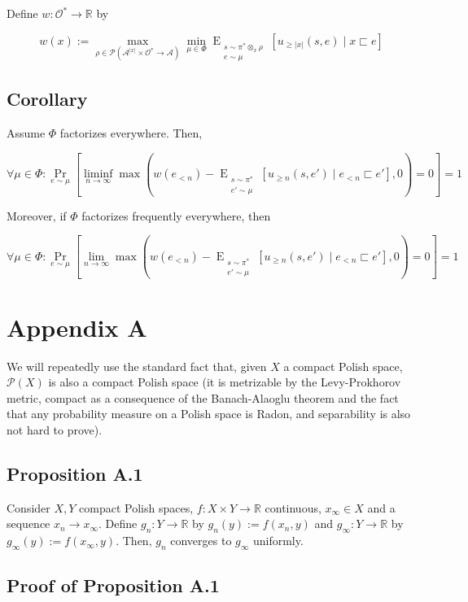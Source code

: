 \documentclass[a4paper]{article}
\DeclareMathOperator{\Prb}{Pr}
\newcommand{\EE}[2]{\operatorname{E}_{\substack{#1 \\ #2}}}
\newcommand{\Reals}{\mathbb{R}}
\newcommand{\Abs}[1]{\lvert #1 \rvert}
\newcommand{\Prob}{\mathcal{P}}
\newcommand{\Act}{\mathcal{A}}
\newcommand{\Obs}{\mathcal{O}}
\begin{document}
Define ${w: \Obs^* \rightarrow \Reals}$ by

$$w(x):=\max_{\rho \in \Prob(\Act^{\Abs{x}} \times \Obs^* \rightarrow \Act)} \min_{\mu \in \Phi} \EE{s \sim \pi^* \otimes_x \rho}{e \sim \mu}[u_{\geq \Abs{x}}(s,e) \mid x \sqsubset e]$$

\subsection{Corollary}

Assume ${\Phi}$ factorizes everywhere. Then,

$$\forall \mu \in \Phi: \Prb_{e \sim \mu}[\liminf_{n \rightarrow \infty} \max(w(e_{<n})-\EE{s \sim \pi^*}{e' \sim \mu}[u_{\geq n}(s,e') \mid e_{<n} \sqsubset e'] ,0)=0] = 1$$

Moreover, if ${\Phi}$ factorizes frequently everywhere, then

$$\forall \mu \in \Phi: \Prb_{e \sim \mu}[\lim_{n \rightarrow \infty} \max(w(e_{<n})-\EE{s \sim \pi^*}{e' \sim \mu}[u_{\geq n}(s,e') \mid e_{<n} \sqsubset e'] ,0)=0] = 1$$

\section{Appendix A}

We will repeatedly use the standard fact that, given ${X}$ a compact Polish space, ${\Prob(X)}$ is also a compact Polish space (it is metrizable by the Levy-Prokhorov metric, compact as a consequence of the Banach-Alaoglu theorem and the fact that any probability measure on a Polish space is Radon, and separability is also not hard to prove).

\subsection{Proposition A.1}

Consider ${X, Y}$ compact Polish spaces, ${f: X \times Y \rightarrow \Reals}$ continuous, ${x_\infty \in X}$ and a sequence ${x_n \rightarrow x_\infty}$. Define ${g_n: Y \rightarrow \Reals}$ by ${g_n(y):=f(x_n,y)}$ and ${g_\infty: Y \rightarrow \Reals}$ by ${g_\infty(y):=f(x_\infty,y)}$. Then, ${g_n}$ converges to ${g_\infty}$ uniformly.

\subsection{Proof of Proposition A.1}
\end{document}
